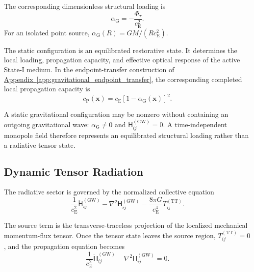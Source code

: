 The corresponding dimensionless structural loading is
\begin{equation}
    \alpha_{\mathrm{G}} = - \frac{ \Phi_{\tau} }{ c_{\mathrm{E}}^{2} }.
    \label{eq:n12_alpha_static_relation}
\end{equation}
For an isolated point source, $\alpha_{\mathrm{G}}(R) = GM / (Rc_{\mathrm{E}}^{2})$.

The static configuration is an equilibrated restorative state. It determines the local loading, propagation capacity, and effective optical response of the active State-I medium. In the endpoint-transfer construction of \hyperref[app:gravitational_endpoint_transfer]{Appendix~\ref*{app:gravitational_endpoint_transfer}}, the corresponding completed local propagation capacity is
\begin{equation}
    c_{\mathrm{P}}(\mathbf{x}) = c_{\mathrm{E}} \left[ 1-\alpha_{\mathrm{G}}(\mathbf{x}) \right]^{2}.
    \label{eq:n12_loaded_propagation_capacity}
\end{equation}

A static gravitational configuration may be nonzero without containing an outgoing gravitational wave: $\alpha_{\mathrm{G}} \neq 0$ and $\mathsf{H}_{ij}^{(\mathrm{GW})} = 0$. A time-independent monopole field therefore represents an equilibrated structural loading rather than a radiative tensor state.

\subsection{Dynamic Tensor Radiation}
\label{subsec:n12_dynamic_radiation}

The radiative sector is governed by the normalized collective equation
\begin{equation}
    \frac{1}{ c_{\mathrm{E}}^{2} } \ddot{\mathsf{H}}_{ij}^{(\mathrm{GW})} - \nabla^{2} \mathsf{H}_{ij}^{(\mathrm{GW})} = \frac{ 8\pi G }{ c_{\mathrm{E}}^{4} } T_{ij}^{(\mathrm{TT})}.
    \label{eq:n12_dynamic_tensor_equation}
\end{equation}

The source term is the transverse-traceless projection of the localized mechanical momentum-flux tensor. Once the tensor state leaves the source region, $T_{ij}^{(\mathrm{TT})} = 0$, and the propagation equation becomes
\begin{equation}
    \frac{1}{ c_{\mathrm{E}}^{2} } \ddot{\mathsf{H}}_{ij}^{(\mathrm{GW})} - \nabla^{2} \mathsf{H}_{ij}^{(\mathrm{GW})} = 0.
    \label{eq:n12_free_tensor_equation}
\end{equation}

